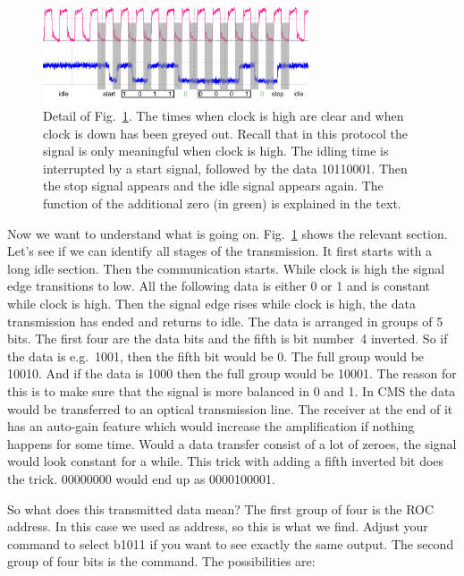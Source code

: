 \begin{figure}[h]
    \begin{center}
	\includegraphics[width=0.7\textwidth]{img/tut_scope3_crop.pdf}
	\caption{Detail of Fig.~\ref{fig:tut_scope3}. The times when clock is high are clear and when clock is down has been greyed out. Recall that in this protocol the signal is only meaningful when clock is high. The idling time is interrupted by a start signal, followed by the data 10110001. Then the stop signal appears and the idle signal appears again. The function of the additional zero (in green) is explained in the text.}
	\label{fig:tut_scope3}
    \end{center}
\end{figure}

Now we want to understand what is going on. Fig.~\ref{fig:tut_scope3} shows the relevant section. Let's see if we can identify all stages of the transmission. It first starts with a long idle section. Then the communication starts. While clock is high the signal edge transitions to low. All the following data is either 0 or 1 and is constant while clock is high. Then the signal edge rises while clock is high, the data transmission has ended and returns to idle. The data is arranged in groups of 5 bits. The first four are the data bits and the fifth is bit number~4 inverted. So if the data is e.g.~1001, then the fifth bit would be 0. The full group would be 10010. And if the data is 1000 then the full group would be 10001. The reason for this is to make sure that the signal is more balanced in 0 and 1. In CMS the data would be transferred to an optical transmission line. The receiver at the end of it has an auto-gain feature which would increase the amplification if nothing happens for some time. Would a data transfer consist of a lot of zeroes, the signal would look constant for a while. This trick with adding a fifth inverted bit does the trick. 00000000 would end up as 0000100001.

So what does this transmitted data mean? The first group of four is the ROC address. In this case we used  as address, so this is what we find. Adjust your  command to select b1011 if you want to see exactly the same output. The second group of four bits is the command. The possibilities are:

